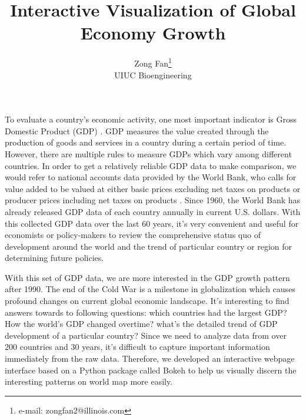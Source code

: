 \documentclass{vgtc}                          %
\title{Interactive Visualization of Global Economy Growth}
\author{Zong Fan\thanks{e-mail: zongfan2@illinois.com}\\ %
        \scriptsize UIUC Bioengineering} %
\begin{document}


\maketitle

To evaluate a country's economic activity, one most important indicator is Gross Domestic Product (GDP) \cite{Jacob:2019:gdp}. GDP measures the value created through the production of goods and services in a country during a certain period of time. However, there are multiple rules to measure GDPs which vary among different countries. In order to get a relatively reliable GDP data to make comparison, we would refer to  national accounts data provided by the World Bank, who calls for value added to be valued at either basic prices excluding net taxes on products or producer prices including net taxes on products \cite{worldbank:2020:gdp}. Since 1960, the World Bank has already released GDP data of each country annually in current U.S. dollars. With this collected GDP data over the last 60 years, it's very convenient and useful for economists or policy-makers to review the comprehensive status quo of development around the world and the trend of particular country or region for determining future policies. 

With this set of GDP data, we are more interested in the GDP growth pattern after 1990. The end of the Cold War is a milestone in globalization which causes profound changes on current global economic landscape. It's interesting to find answers towards to following questions: which countries had the largest GDP? How the world's GDP changed overtime? what's the detailed trend of GDP development of a particular country? Since we need to analyze data from over 200 countries and 30 years, it's difficult to capture important information immediately from the raw data. Therefore, we developed an interactive webpage interface based on a Python package called Bokeh \cite{bokeh:2018} to help us visually discern the interesting patterns on world map more easily. 
\end{document}
